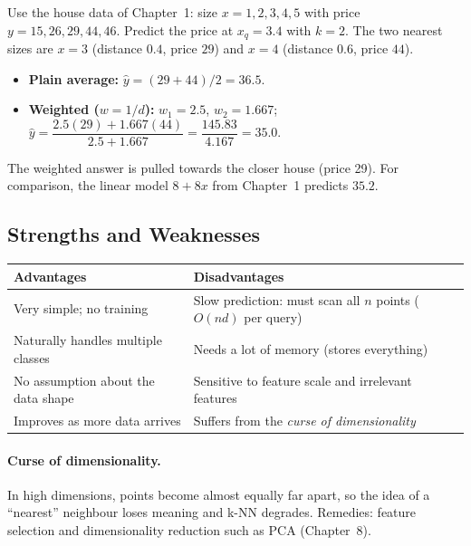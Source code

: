 \begin{example}[: k-NN regression]
Use the house data of Chapter~1: size $x=1,2,3,4,5$ with price $y=15,26,29,44,46$. Predict the price at $x_q=3.4$ with $k=2$. The two nearest sizes are $x=3$ (distance $0.4$, price $29$) and $x=4$ (distance $0.6$, price $44$).
\begin{itemize}
  \item \textbf{Plain average:} $\hat y=(29+44)/2=36.5$.
  \item \textbf{Weighted ($w=1/d$):} $w_1=2.5$, $w_2=1.667$; $\hat y=\dfrac{2.5(29)+1.667(44)}{2.5+1.667}=\dfrac{145.83}{4.167}=35.0$.
\end{itemize}
The weighted answer is pulled towards the closer house (price 29). For comparison, the linear model $8+8x$ from Chapter~1 predicts $35.2$.
\end{example}

\subsection{Strengths and Weaknesses}

\begin{center}
\begin{tabular}{@{}p{6.7cm}p{6.7cm}@{}}
\toprule
\textbf{Advantages} & \textbf{Disadvantages}\\
\midrule
Very simple; no training & Slow prediction: must scan all $n$ points ($O(nd)$ per query)\\
Naturally handles multiple classes & Needs a lot of memory (stores everything)\\
No assumption about the data shape & Sensitive to feature scale and irrelevant features\\
Improves as more data arrives & Suffers from the \emph{curse of dimensionality}\\
\bottomrule
\end{tabular}
\end{center}

\paragraph{Curse of dimensionality.} In high dimensions, points become almost equally far apart, so the idea of a ``nearest'' neighbour loses meaning and k-NN degrades. Remedies: feature selection and dimensionality reduction such as PCA (Chapter~8).

